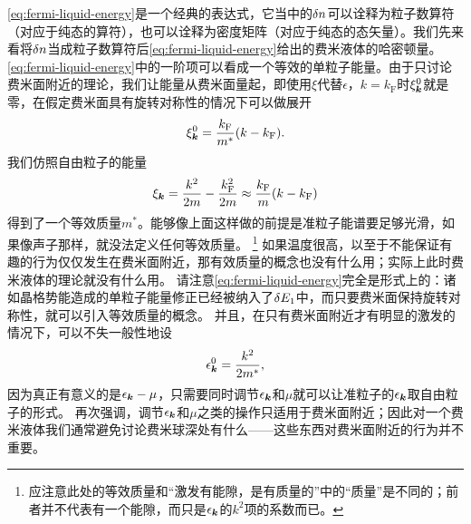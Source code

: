 \documentclass[hyperref, UTF8, a4paper]{ctexart}
\begin{document}
\eqref{eq:fermi-liquid-energy}是一个经典的表达式，它当中的$\var{n}$可以诠释为粒子数算符（对应于纯态的算符），也可以诠释为密度矩阵（对应于纯态的态矢量）。我们先来看将$\var{n}$当成粒子数算符后\eqref{eq:fermi-liquid-energy}给出的费米液体的哈密顿量。
\eqref{eq:fermi-liquid-energy}中的一阶项可以看成一个等效的单粒子能量。由于只讨论费米面附近的理论，我们让能量从费米面量起，即使用$\xi$代替$\epsilon$，$k=k_\text{F}$时$\xi^0_{\vb*{k}}$就是零，在假定费米面具有旋转对称性的情况下可以做展开
\[
    \xi^0_{\vb*{k}} = \frac{k_\text{F}}{m^*} (k - k_\text{F}).
\]
我们仿照自由粒子的能量
\[
    \xi_{\vb*{k}} = \frac{k^2}{2m} - \frac{k_\text{F}^2}{2m} \approx \frac{k_\text{F}}{m} (k - k_\text{F})
\]
得到了一个等效质量$m^*$。能够像上面这样做的前提是准粒子能谱要足够光滑，如果像声子那样，就没法定义任何等效质量。%
\footnote{应注意此处的等效质量和“激发有能隙，是有质量的”中的“质量”是不同的；前者并不代表有一个能隙，而只是$\epsilon_{\vb*{k}}$的$k^2$项的系数而已。}%
如果温度很高，以至于不能保证有趣的行为仅仅发生在费米面附近，那有效质量的概念也没有什么用；实际上此时费米液体的理论就没有什么用。
请注意\eqref{eq:fermi-liquid-energy}完全是形式上的：诸如晶格势能造成的单粒子能量修正已经被纳入了$\var{E_1}$中，而只要费米面保持旋转对称性，就可以引入等效质量的概念。
并且，在只有费米面附近才有明显的激发的情况下，可以不失一般性地设
\[
    \epsilon_{\vb*{k}}^0 = \frac{k^2}{2m^*},
\]
因为真正有意义的是$\epsilon_{\vb*{k}} - \mu$，只需要同时调节$\epsilon_{\vb*{k}}$和$\mu$就可以让准粒子的$\epsilon_{\vb*{k}}$取自由粒子的形式。
再次强调，调节$\epsilon_{\vb*{k}}$和$\mu$之类的操作只适用于费米面附近；因此对一个费米液体我们通常避免讨论费米球深处有什么——这些东西对费米面附近的行为并不重要。
\end{document}
